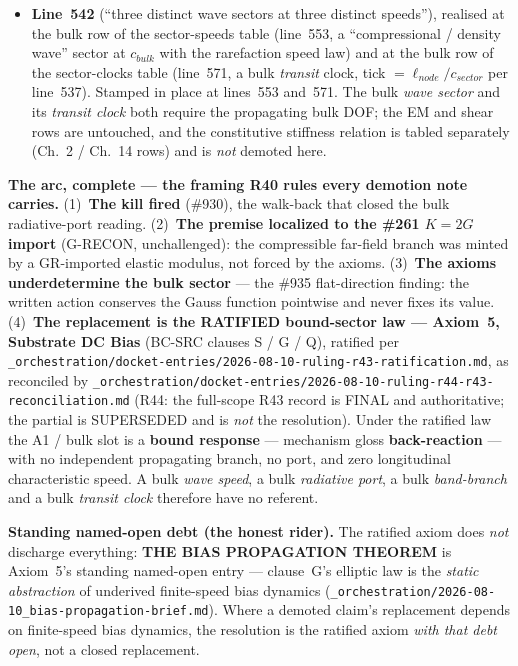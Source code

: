 \begin{itemize}
  \item \textbf{Line~542} (``three distinct wave sectors at three distinct speeds''), realised at the bulk row of the sector-speeds table (line~553, a ``compressional / density wave'' sector at $c_{bulk}$ with the rarefaction speed law) and at the bulk row of the sector-clocks table (line~571, a bulk \emph{transit} clock, tick $= \ell_{node}/c_{sector}$ per line~537). Stamped in place at lines~553 and~571. The bulk \emph{wave sector} and its \emph{transit clock} both require the propagating bulk DOF; the EM and shear rows are untouched, and the constitutive stiffness relation is tabled separately (Ch.~2 / Ch.~14 rows) and is \emph{not} demoted here.
\end{itemize}

\noindent\textbf{The arc, complete --- the framing R40 rules every demotion note
carries.} (1)~\textbf{The kill fired} (\#930), the walk-back that closed the bulk
radiative-port reading. (2)~\textbf{The premise localized to the \#261 $K = 2G$ import}
(G-RECON, unchallenged): the compressible far-field branch was minted by a GR-imported
elastic modulus, not forced by the axioms. (3)~\textbf{The axioms underdetermine the bulk
sector} --- the \#935 flat-direction finding: the written action conserves the Gauss
function pointwise and never fixes its value. (4)~\textbf{The replacement is the RATIFIED
bound-sector law --- Axiom~5, Substrate DC Bias} (BC-SRC clauses S / G / Q), ratified per
\texttt{\_orchestration/docket-entries/2026-08-10-ruling-r43-ratification.md}, as reconciled by \texttt{\_orchestration/docket-entries/2026-08-10-ruling-r44-r43-reconciliation.md} (R44: the
full-scope R43 record is FINAL and authoritative; the partial
\texttt{} is SUPERSEDED and is \emph{not} the
resolution). Under the ratified law the A1 / bulk slot is a \textbf{bound response} ---
mechanism gloss \textbf{back-reaction} --- with no independent propagating branch, no port,
and zero longitudinal characteristic speed. A bulk \emph{wave speed}, a bulk \emph{radiative
port}, a bulk \emph{band-branch} and a bulk \emph{transit clock} therefore have no referent.

\noindent\textbf{Standing named-open debt (the honest rider).} The ratified axiom does
\emph{not} discharge everything: \textbf{THE BIAS PROPAGATION THEOREM} is Axiom~5's standing
named-open entry --- clause~G's elliptic law is the \emph{static abstraction} of underived
finite-speed bias dynamics (\texttt{\_orchestration/2026-08-10\_bias-propagation-brief.md}). Where a demoted claim's
replacement depends on finite-speed bias dynamics, the resolution is the ratified axiom
\emph{with that debt open}, not a closed replacement.

